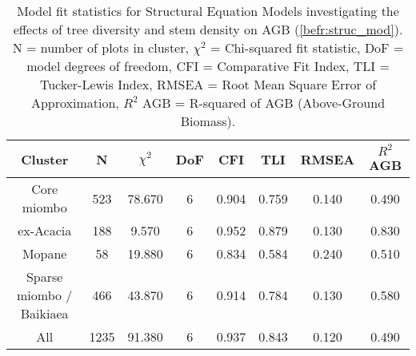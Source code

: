 
\begin{table}[!htbp] \centering 
  	\caption[Model fit statistics per vegetation type]{Model fit statistics for Structural Equation Models investigating the effects of tree diversity and stem density on AGB (\autoref{befr:struc_mod}). N = number of plots in cluster, $\chi^{2}$ = Chi-squared fit statistic, DoF = model degrees of freedom, CFI = Comparative Fit Index, TLI = Tucker-Lewis Index, RMSEA = Root Mean Square Error of Approximation, $R^{2}$ AGB = R-squared of AGB (Above-Ground Biomass).} 
  \label{befr:struc_model_fit_clust_stats} 
\begin{tabular}{cccccccc} 
\hline 
{Cluster} & {N} & {$\chi^{2}$} & {DoF} & {CFI} & {TLI} & {RMSEA} & {$R^{2}$ AGB} \\
\hline 
Core miombo & 523 & 78.670 & 6 & 0.904 & 0.759 & 0.140 & 0.490 \\ 
ex-Acacia & 188 & 9.570 & 6 & 0.952 & 0.879 & 0.130 & 0.830 \\ 
Mopane & 58 & 19.880 & 6 & 0.834 & 0.584 & 0.240 & 0.510 \\ 
Sparse miombo / Baikiaea & 466 & 43.870 & 6 & 0.914 & 0.784 & 0.130 & 0.580 \\ 
All & 1235 & 91.380 & 6 & 0.937 & 0.843 & 0.120 & 0.490 \\ 
\hline 
\end{tabular} 
\end{table} 
